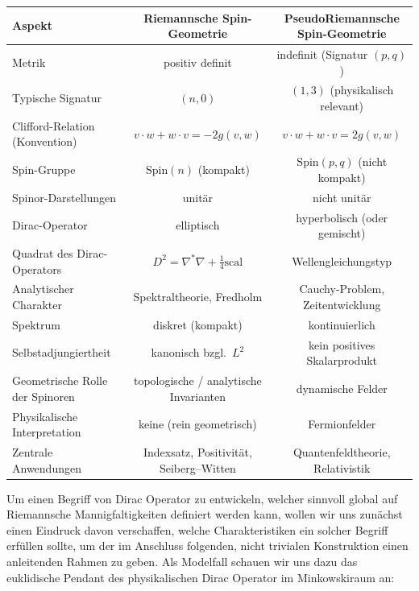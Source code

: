 \documentclass[10pt, letterpaper]{article}
\begin{document}
\begin{center}
\renewcommand{\arraystretch}{1.25}
\hspace*{-1cm}
\begin{tabular}{|l|c|c|}
\hline
\textbf{Aspekt} 
& \textbf{Riemannsche Spin-Geometrie} 
& \textbf{PseudoRiemannsche Spin-Geometrie} \\
\hline
Metrik 
& positiv definit 
& indefinit (Signatur $(p,q)$) \\
\hline
Typische Signatur 
& $(n,0)$ 
& $(1,3)$ (physikalisch relevant) \\
\hline
Clifford-Relation (Konvention)
& $v\cdot w + w\cdot v = -2g(v,w)$ 
& $v\cdot w + w\cdot v = 2g(v,w)$ \\
\hline
Spin-Gruppe 
& $\mathrm{Spin}(n)$ (kompakt) 
& $\mathrm{Spin}(p,q)$ (nicht kompakt) \\
\hline
Spinor-Darstellungen 
& unitär 
& nicht unitär \\
\hline
Dirac-Operator 
& elliptisch 
& hyperbolisch (oder gemischt) \\
\hline
Quadrat des Dirac-Operators 
& $D^2 = \nabla^*\nabla + \tfrac14\mathrm{scal}$ 
& Wellengleichungstyp \\
\hline
Analytischer Charakter 
& Spektraltheorie, Fredholm 
& Cauchy-Problem, Zeitentwicklung \\
\hline
Spektrum 
& diskret (kompakt) 
& kontinuierlich \\
\hline
Selbstadjungiertheit 
& kanonisch bzgl.\ $L^2$ 
& kein positives Skalarprodukt \\
\hline
Geometrische Rolle der Spinoren 
& topologische / analytische Invarianten 
& dynamische Felder \\
\hline
Physikalische Interpretation 
& keine (rein geometrisch) 
& Fermionfelder \\
\hline
Zentrale Anwendungen 
& Indexsatz, Positivität, Seiberg--Witten 
& Quantenfeldtheorie, Relativistik \\
\hline
\end{tabular}
\end{center}
\vspace{0.8cm}



Um einen Begriff von Dirac Operator zu entwickeln, welcher sinnvoll global auf Riemannsche Mannigfaltigkeiten definiert werden kann, wollen wir uns zunächst einen Eindruck davon verschaffen, welche Charakteristiken ein solcher Begriff erfüllen sollte, um der im Anschluss folgenden, nicht trivialen Konstruktion einen anleitenden Rahmen zu geben. Als Modelfall schauen wir uns dazu das euklidische Pendant des physikalischen Dirac Operator im Minkowskiraum an:
\end{document}

